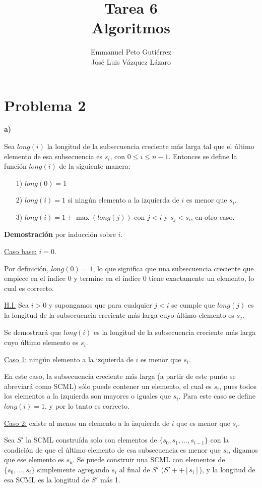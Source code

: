 \documentclass{article}
\title{Tarea 6\\Algoritmos}
\author{Emmanuel Peto Gutiérrez\\José Luis Vázquez Lázaro}
\begin{document}
\maketitle

\section*{Problema 2}

\textbf{a)}

Sea $long(i)$ la longitud de la subsecuencia creciente más larga tal que el último elemento de esa subsecuencia es $s_i$, con $0 \leq i \leq n-1$. Entonces se define la función $long(i)$ de la siguiente manera:

\begin{itemize}
\item[1)] $long(0) = 1$
\item[2)] $long(i) = 1$ si ningún elemento a la izquierda de $i$ es menor que $s_i$.
\item[3)] $long(i) = 1 + \max (long(j))$ con $j<i$ y $s_j < s_i$, en otro caso.
\end{itemize}

\textbf{Demostración} por inducción sobre $i$.

\underline{Caso base:} $i = 0$.

Por definición, $long(0) = 1$, lo que significa que una subsecuencia creciente que empiece en el índice 0 y termine en el índice 0 tiene exactamente un elemento, lo cual es correcto.

\underline{H.I.} Sea $i>0$ y supongamos que para cualquier $j<i$ se cumple que $long(j)$ es la longitud de la subsecuencia creciente más larga cuyo último elemento es $s_j$.

Se demostrará que $long(i)$ es la longitud de la subsecuencia creciente más larga cuyo último elemento es $s_i$.

\underline{Caso 1:} ningún elemento a la izquierda de $i$ es menor que $s_i$.

En este caso, la subsecuencia creciente más larga (a partir de este punto se abreviará como SCML) sólo puede contener un elemento, el cual es $s_i$, pues todos los elementos a la izquierda son mayores o iguales que $s_i$. Para este caso se define $long(i) = 1$, y por lo tanto es correcto.

\underline{Caso 2:} existe al menos un elemento a la izquierda de $i$ que es menor que $s_i$.

Sea $S'$ la SCML construída solo con elementos de $\{ s_0, s_1, ..., s_{i-1} \}$ con la condición de que el último elemento de esa subsecuencia es menor que $s_i$, digamos que ese elemento es $s_k$. Se puede construir una SCML con elementos de $\{ s_0, ..., s_i \}$ simplemente agregando $s_i$ al final de $S'$ ($S'++[s_i]$), y la longitud de esa SCML es la longitud de $S'$ más 1.
\end{document}
